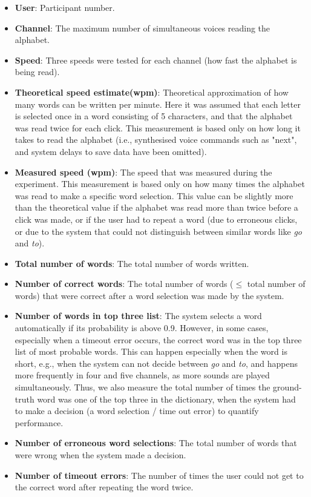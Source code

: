 \documentclass[10pt,fleqn,a4paper]{article}
\begin{document}
\begin{itemize}
\item {\bf User}: Participant number. 
\item {\bf Channel}: The maximum number of simultaneous voices reading the alphabet. 
\item {\bf Speed}: Three speeds were tested for each channel (how fast the alphabet is being read).
\item {\bf Theoretical speed estimate(wpm)}: Theoretical approximation of how many words can be written per minute. Here it was assumed that each letter is selected once in a word consisting of 5 characters, and that the alphabet was read twice for each click. This measurement is based only on how long it takes to read the alphabet (i.e., synthesised voice commands such as "next", and system delays to save data have been omitted). 
\item {\bf Measured speed (wpm)}: The speed that was measured during the experiment. This measurement is based only on how many times the alphabet was read to make a specific word selection. This value can be slightly more than the theoretical value if the alphabet was read more than twice before a click was made, or if the user had to repeat a word (due to erroneous clicks, or due to the system that could not distinguish between similar words like {\em go} and {\em to}). 
\item {\bf Total number of words}: The total number of words written. 
\item {\bf Number of correct words}: The total number of words ($\leq$ total number of words) that were correct after a word selection was made by the system.
\item {\bf Number of words in top three list}: The system selects a word automatically if its probability is above 0.9. However, in some cases, especially when a timeout error occurs, the correct
word was in the top three list of most probable words. This can happen especially when the word is short, e.g., when the system can not decide between {\em go} and {\em to}, and happens more 
frequently in four and five channels, as more sounds are played simultaneously. Thus, we also measure the total number of times the ground-truth word was one of 
the top three in the dictionary, when the system had to make a decision (a word selection / time out error) to quantify performance.  
\item {\bf Number of erroneous word selections}: The total number of words that were wrong when the system made a decision. 
\item {\bf Number of timeout errors}: The number of times the user could not get to the correct word after repeating the word twice. 

\end{itemize}
\end{document}
